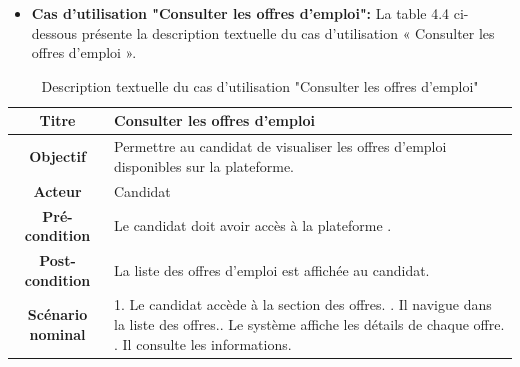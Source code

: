\begin{itemize}
        \item \textbf{Cas d'utilisation "Consulter les offres d'emploi": } La table 4.4 ci-dessous présente la description textuelle du cas d'utilisation « Consulter les offres d'emploi ».
    \end{itemize}
    \begin{table}[H]
    \caption{ Description textuelle du cas d’utilisation "Consulter les offres d'emploi"}
    \centering
    \begin{tabular}{|c|p{12cm}|}
    \hline
    \textbf{Titre} & Consulter les offres d'emploi \\
    \hline
    \textbf{Objectif} & Permettre au candidat de visualiser les offres d’emploi disponibles sur la plateforme. \\
    \hline
    \textbf{Acteur}& Candidat\\
    \hline
    \textbf{Pré-condition} & Le candidat doit avoir accès à la plateforme .
    \\
    \hline
    \textbf{Post-condition} & La liste des offres d’emploi est affichée au candidat.\\
    \hline
    \textbf{Scénario nominal} & 1. Le candidat accède à la section des offres. \newline
    2. Il navigue dans la liste des offres.\newline
    3. Le système affiche les détails de chaque offre.
    \newline
    4. Il consulte les informations.\\
    \hline
    \end{tabular}
    \label{tab:user_stories}
\end{table}

